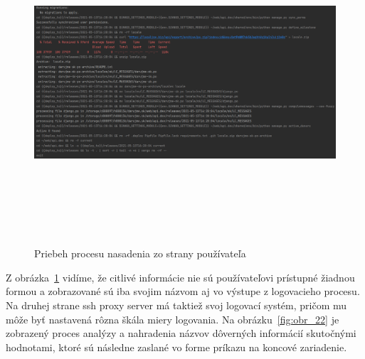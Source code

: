 \begin{figure}[H]
\begin{center}\includegraphics[width=\textwidth,height=12cm,keepaspectratio=true]{assets/log_deploy_user.png}\end{center}
\caption[Priebeh procesu nasadenia zo strany používateľa]{Priebeh procesu nasadenia zo strany používateľa}\label{fig:obr_21}
\end{figure}

Z obrázka~\ref{fig:obr_21} vidíme, že citlivé informácie nie sú používateľovi prístupné žiadnou formou a zobrazované sú
iba svojim názvom aj vo výstupe z logovacieho procesu. Na druhej strane ssh proxy server má taktiež svoj logovací systém, pričom mu môže byť
nastavená rôzna škála miery logovania. Na obrázku~\ref{fig:obr_22} je zobrazený proces analýzy a nahradenia názvov dôverných
informácií skutočnými hodnotami, ktoré sú následne zaslané vo forme príkazu na koncové zariadenie.

